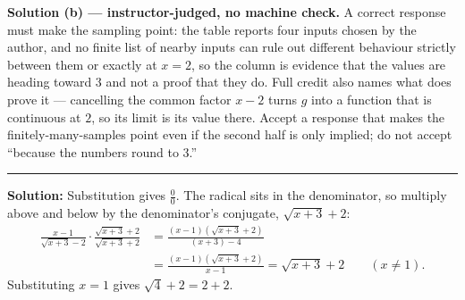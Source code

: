 \documentclass[12pt]{article}
\begin{document}
\textbf{Solution (b) --- instructor-judged, no machine check.} A correct
response must make the sampling point: the table reports four inputs chosen by
the author, and no finite list of nearby inputs can rule out different behaviour
strictly between them or exactly at $x = 2$, so the column is evidence that the
values are heading toward $3$ and not a proof that they do. Full credit also
names what does prove it --- cancelling the common factor $x - 2$ turns $g$ into
a function that is continuous at $2$, so its limit is its value there. Accept a
response that makes the finitely-many-samples point even if the second half is
only implied; do not accept ``because the numbers round to 3.''

\vspace{0.2cm}\noindent\rule{\linewidth}{0.2pt}\vspace{0.2cm}


\textbf{Solution:} Substitution gives $\frac{0}{0}$. The radical sits in the
denominator, so multiply above and below by the denominator's conjugate,
$\sqrt{x+3} + 2$:
\begin{align*}
  \frac{x-1}{\sqrt{x+3} - 2} \cdot \frac{\sqrt{x+3} + 2}{\sqrt{x+3} + 2}
    &= \frac{(x-1)\left(\sqrt{x+3} + 2\right)}{(x + 3) - 4} \\[2pt]
    &= \frac{(x-1)\left(\sqrt{x+3} + 2\right)}{x - 1}
     = \sqrt{x+3} + 2 \qquad (x \neq 1).
\end{align*}
Substituting $x = 1$ gives $\sqrt{4} + 2 = 2 + 2$. 
\end{document}
